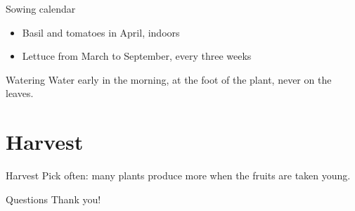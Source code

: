 \documentclass[aspectratio=169]{beamer}
\begin{document}
\begin{frame}{Sowing calendar}
  \begin{itemize}
    \item<1-> Basil and tomatoes in April, indoors
    \item<2-> Lettuce from March to September, every three weeks
  \end{itemize}
\end{frame}

\begin{frame}{Watering}
  Water early in the morning, at the foot of the plant, never on the leaves.
\end{frame}

\section{Harvest}

\begin{frame}{Harvest}
  Pick often: many plants produce more when the fruits are taken young.
\end{frame}

\begin{frame}{Questions}
  Thank you!
\end{frame}
\end{document}
